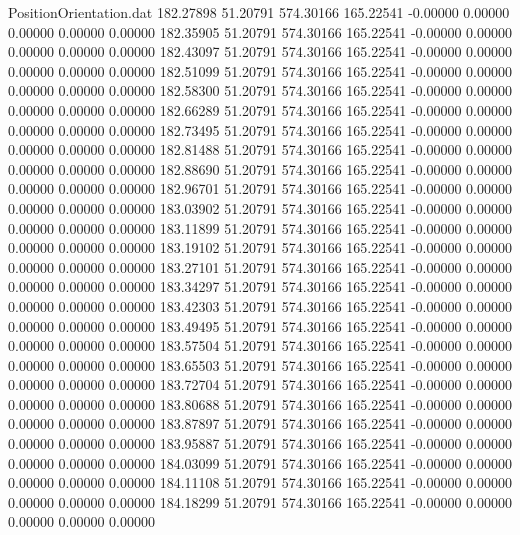 \begin{filecontents}{PositionOrientation.dat}
 182.27898   51.20791  574.30166   165.22541   -0.00000    0.00000    0.00000    0.00000    0.00000
 182.35905   51.20791  574.30166   165.22541   -0.00000    0.00000    0.00000    0.00000    0.00000
 182.43097   51.20791  574.30166   165.22541   -0.00000    0.00000    0.00000    0.00000    0.00000
 182.51099   51.20791  574.30166   165.22541   -0.00000    0.00000    0.00000    0.00000    0.00000
 182.58300   51.20791  574.30166   165.22541   -0.00000    0.00000    0.00000    0.00000    0.00000
 182.66289   51.20791  574.30166   165.22541   -0.00000    0.00000    0.00000    0.00000    0.00000
 182.73495   51.20791  574.30166   165.22541   -0.00000    0.00000    0.00000    0.00000    0.00000
 182.81488   51.20791  574.30166   165.22541   -0.00000    0.00000    0.00000    0.00000    0.00000
 182.88690   51.20791  574.30166   165.22541   -0.00000    0.00000    0.00000    0.00000    0.00000
 182.96701   51.20791  574.30166   165.22541   -0.00000    0.00000    0.00000    0.00000    0.00000
 183.03902   51.20791  574.30166   165.22541   -0.00000    0.00000    0.00000    0.00000    0.00000
 183.11899   51.20791  574.30166   165.22541   -0.00000    0.00000    0.00000    0.00000    0.00000
 183.19102   51.20791  574.30166   165.22541   -0.00000    0.00000    0.00000    0.00000    0.00000
 183.27101   51.20791  574.30166   165.22541   -0.00000    0.00000    0.00000    0.00000    0.00000
 183.34297   51.20791  574.30166   165.22541   -0.00000    0.00000    0.00000    0.00000    0.00000
 183.42303   51.20791  574.30166   165.22541   -0.00000    0.00000    0.00000    0.00000    0.00000
 183.49495   51.20791  574.30166   165.22541   -0.00000    0.00000    0.00000    0.00000    0.00000
 183.57504   51.20791  574.30166   165.22541   -0.00000    0.00000    0.00000    0.00000    0.00000
 183.65503   51.20791  574.30166   165.22541   -0.00000    0.00000    0.00000    0.00000    0.00000
 183.72704   51.20791  574.30166   165.22541   -0.00000    0.00000    0.00000    0.00000    0.00000
 183.80688   51.20791  574.30166   165.22541   -0.00000    0.00000    0.00000    0.00000    0.00000
 183.87897   51.20791  574.30166   165.22541   -0.00000    0.00000    0.00000    0.00000    0.00000
 183.95887   51.20791  574.30166   165.22541   -0.00000    0.00000    0.00000    0.00000    0.00000
 184.03099   51.20791  574.30166   165.22541   -0.00000    0.00000    0.00000    0.00000    0.00000
 184.11108   51.20791  574.30166   165.22541   -0.00000    0.00000    0.00000    0.00000    0.00000
 184.18299   51.20791  574.30166   165.22541   -0.00000    0.00000    0.00000    0.00000    0.00000

\end{filecontents}
